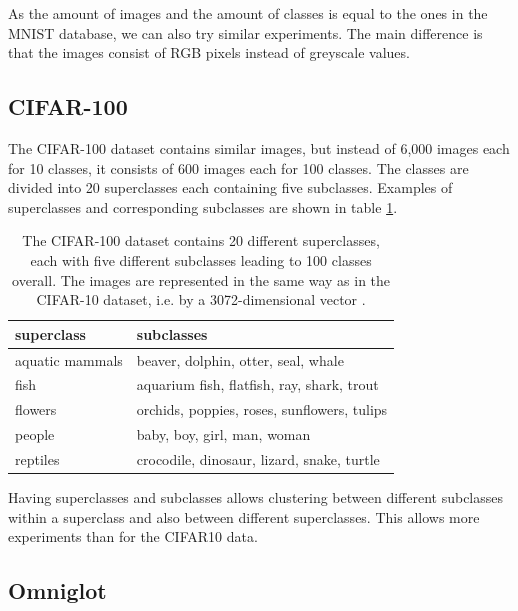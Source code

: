 As the amount of images and the amount of classes is equal to the ones in the MNIST database, we can also try similar experiments. The main difference is that the images consist of RGB pixels instead of greyscale values.

\subsection{CIFAR-100}

The CIFAR-100 dataset contains similar images, but instead of 6,000 images each for 10 classes, it consists of 600 images each for 100 classes. The classes are divided into 20 superclasses each containing five subclasses. Examples of superclasses and corresponding subclasses are shown in table \ref{table:cifar100data}. 

\begin{table}[h]
    \centering
    \begin{tabular}{|l|l|}
    \hline
    superclass      & subclasses                                  \\ \hline
    aquatic mammals & beaver, dolphin, otter, seal, whale         \\
    fish            & aquarium fish, flatfish, ray, shark, trout  \\
    flowers         & orchids, poppies, roses, sunflowers, tulips \\
    people          & baby, boy, girl, man, woman                 \\ 
    reptiles        & crocodile, dinosaur, lizard, snake, turtle  \\ \hline               
    \end{tabular}
    \caption{The CIFAR-100 dataset contains 20 different superclasses, each with five different subclasses leading to 100 classes overall. The images are represented in the same way as in the CIFAR-10 dataset, i.e. by a 3072-dimensional vector \cite{Krizhevsky2009LearningML}.}
    \label{table:cifar100data}
\end{table}

Having superclasses and subclasses allows clustering between different subclasses within a superclass and also between different superclasses. This allows more experiments than for the CIFAR10 data.

\subsection{Omniglot}

